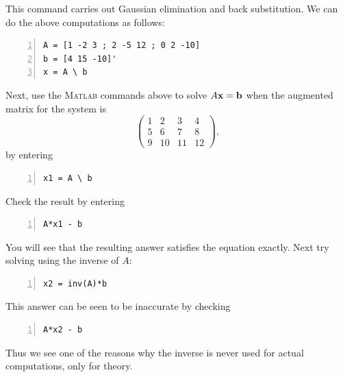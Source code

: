 This command carries out Gaussian elimination and back substitution.
We can do the above computations as follows:
\begin{lstlisting}[frame=none,numbers=left]
A = [1 -2 3 ; 2 -5 12 ; 0 2 -10]
b = [4 15 -10]'
x = A \ b
\end{lstlisting}

Next, use the \textsc{Matlab} commands above to solve $A \mathbf{x} = \mathbf{b}$ when
the augmented matrix for the system is
 $$
\left(\begin{array}{ccc|c}
        1 & 2 & 3 &  4 \\
        5 & 6 & 7 &  8 \\
        9 &  10 & 11 &  12
      \end{array}\right),
$$
by entering
\begin{lstlisting}[frame=none,numbers=left]
x1 = A \ b
\end{lstlisting}
Check the result by entering
\begin{lstlisting}[frame=none,numbers=left]
A*x1 - b
\end{lstlisting}
You will see that the resulting answer satisfies the equation exactly.
Next try solving using the inverse of $A$:
\begin{lstlisting}[frame=none,numbers=left]
x2 = inv(A)*b
\end{lstlisting}
This answer can be seen to be inaccurate by checking
\begin{lstlisting}[frame=none,numbers=left]
A*x2 - b
\end{lstlisting}
Thus we see one of the reasons why the inverse is never used for actual
computations, only for theory.


